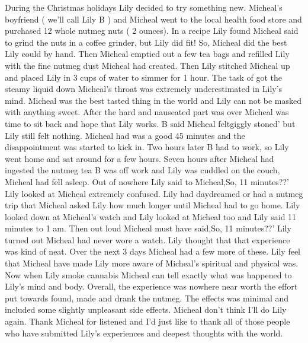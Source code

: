 \documentclass[12pt]{book}
\begin{document}
During the Christmas holidays Lily decided to try something new. Micheal's boyfriend ( we'll call Lily B ) and Micheal went to the local health food store and purchased 12 whole nutmeg nuts ( 2 ounces). In a recipe Lily found Micheal said to grind the nuts in a coffee grinder, but Lily did fit! So, Micheal did the best Lily could by hand. Then Micheal emptied out a few tea bags and refilled Lily with the fine nutmeg dust Micheal had created. Then Lily stitched Micheal up and placed Lily in 3 cups of water to simmer for 1 hour. The task of got the steamy liquid down Micheal's throat was extremely underestimated in Lily's mind. Micheal was the best tasted thing in the world and Lily can not be masked with anything sweet. After the hard and nauseated part was over Micheal was time to sit back and hope that Lily works. B said Micheal feltgiggly stoned' but Lily still felt nothing. Micheal had was a good 45 minutes and the disappointment was started to kick in. Two hours later B had to work, so Lily went home and sat around for a few hours. Seven hours after Micheal had ingested the nutmeg tea B was off work and Lily was cuddled on the couch, Micheal had fell asleep. Out of nowhere Lily said to Micheal,So, 11 minutes??' Lily looked at Micheal extremely confused. Lily had daydreamed or had a nutmeg trip that Micheal asked Lily how much longer until Micheal had to go home. Lily looked down at Micheal's watch and Lily looked at Micheal too and Lily said 11 minutes to 1 am. Then out loud Micheal must have said,So, 11 minutes??' Lily turned out Micheal had never wore a watch. Lily thought that that experience was kind of neat. Over the next 3 days Micheal had a few more of these. Lily feel that Micheal have made Lily more aware of Micheal's spiritual and physical was. Now when Lily smoke cannabis Micheal can tell exactly what was happened to Lily's mind and body. Overall, the experience was nowhere near worth the effort put towards found, made and drank the nutmeg. The effects was minimal and included some slightly unpleasant side effects. Micheal don't think I'll do Lily again. Thank Micheal for listened and I'd just like to thank all of those people who have submitted Lily's experiences and deepest thoughts with the world.
\end{document}
